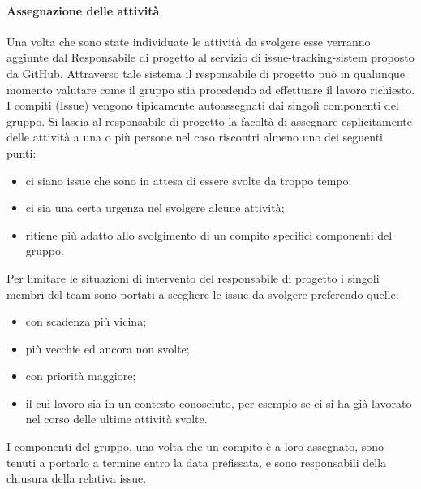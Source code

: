 \paragraph{Assegnazione delle attività}
Una volta che sono state individuate le attività da svolgere esse verranno aggiunte dal Responsabile di progetto al servizio di issue-tracking-sistem proposto da GitHub.
Attraverso tale sistema il responsabile di progetto può in qualunque momento valutare come il gruppo stia procedendo ad effettuare il lavoro richiesto.\\
I compiti (Issue) vengono tipicamente autoassegnati dai singoli componenti del gruppo. Si lascia al responsabile di progetto la facoltà di assegnare esplicitamente delle attività a una o più persone nel caso riscontri almeno uno dei seguenti punti:
\begin{itemize}
    \item ci siano issue che sono in attesa di essere svolte da troppo tempo;
    \item ci sia una certa urgenza nel svolgere alcune attività;
    \item ritiene più adatto allo svolgimento di un compito specifici componenti del gruppo.
\end{itemize}
Per limitare le situazioni di intervento del responsabile di progetto i singoli membri del team sono portati a scegliere le issue da svolgere preferendo quelle:
\begin{itemize}
    \item con scadenza più vicina;
    \item più vecchie ed ancora non svolte;
    \item con priorità maggiore;
    \item il cui lavoro sia in un contesto conosciuto, per esempio se ci si ha già lavorato nel corso delle ultime attività svolte.
\end{itemize}
I componenti del gruppo, una volta che un compito è a loro assegnato, sono tenuti a portarlo a termine entro la data prefissata, e sono responsabili della chiusura della relativa issue.

